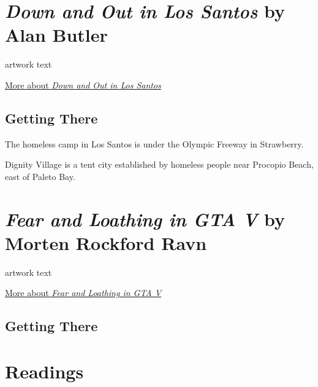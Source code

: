 \documentclass[
  openany]{book}
\begin{document}
\hypertarget{down-and-out-in-los-santos-by-alan-butler}{%
\section*{\texorpdfstring{\emph{Down and Out in Los Santos} by Alan Butler}{Down and Out in Los Santos by Alan Butler}}\label{down-and-out-in-los-santos-by-alan-butler}}

artwork text

\href{http://www.alanbutler.info/down-and-out-in-los-santos-2016}{More about \emph{Down and Out in Los Santos}}

\hypertarget{getting-there-1}{%
\subsection*{Getting There}\label{getting-there-1}}

The homeless camp in Los Santos is under the Olympic Freeway in Strawberry.

Dignity Village is a tent city established by homeless people near Procopio Beach, east of Paleto Bay.

\hypertarget{fear-and-loathing-in-gta-v-by-morten-rockford-ravn}{%
\section*{\texorpdfstring{\emph{Fear and Loathing in GTA V} by Morten Rockford Ravn}{Fear and Loathing in GTA V by Morten Rockford Ravn}}\label{fear-and-loathing-in-gta-v-by-morten-rockford-ravn}}

artwork text

\href{https://fearandloathingingtav.tumblr.com/}{More about \emph{Fear and Loathing in GTA V}}

\hypertarget{getting-there-2}{%
\subsection*{Getting There}\label{getting-there-2}}

\hypertarget{readings-1}{%
\section*{Readings}\label{readings-1}}
\end{document}
